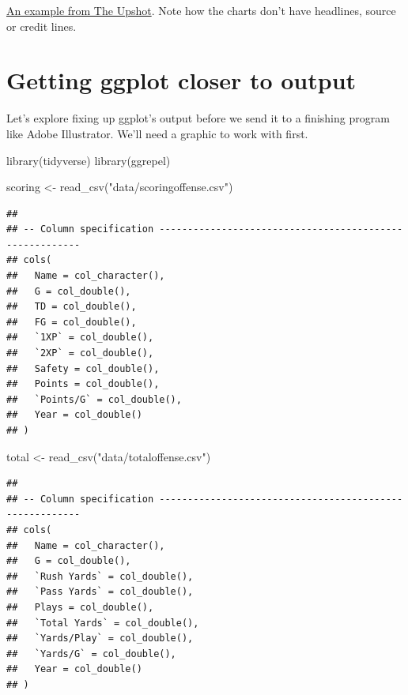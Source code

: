\documentclass[
]{book}
\newenvironment{Shaded}{\begin{snugshade}}{\end{snugshade}}
\newcommand{\FunctionTok}[1]{\textcolor[rgb]{0.00,0.00,0.00}{#1}}
\newcommand{\NormalTok}[1]{#1}
\newcommand{\OtherTok}[1]{\textcolor[rgb]{0.56,0.35,0.01}{#1}}
\newcommand{\StringTok}[1]{\textcolor[rgb]{0.31,0.60,0.02}{#1}}
\begin{document}
\href{https://www.nytimes.com/interactive/2018/02/14/business/economy/inflation-prices.html}{An example from The Upshot}. Note how the charts don't have headlines, source or credit lines.

\hypertarget{getting-ggplot-closer-to-output}{%
\section{Getting ggplot closer to output}\label{getting-ggplot-closer-to-output}}

Let's explore fixing up ggplot's output before we send it to a finishing program like Adobe Illustrator. We'll need a graphic to work with first.

\begin{Shaded}
\begin{Highlighting}[]
\FunctionTok{library}\NormalTok{(tidyverse)}
\FunctionTok{library}\NormalTok{(ggrepel)}
\end{Highlighting}
\end{Shaded}

\begin{Shaded}
\begin{Highlighting}[]
\NormalTok{scoring }\OtherTok{\textless{}{-}} \FunctionTok{read\_csv}\NormalTok{(}\StringTok{"data/scoringoffense.csv"}\NormalTok{)}
\end{Highlighting}
\end{Shaded}

\begin{verbatim}
## 
## -- Column specification --------------------------------------------------------
## cols(
##   Name = col_character(),
##   G = col_double(),
##   TD = col_double(),
##   FG = col_double(),
##   `1XP` = col_double(),
##   `2XP` = col_double(),
##   Safety = col_double(),
##   Points = col_double(),
##   `Points/G` = col_double(),
##   Year = col_double()
## )
\end{verbatim}

\begin{Shaded}
\begin{Highlighting}[]
\NormalTok{total }\OtherTok{\textless{}{-}} \FunctionTok{read\_csv}\NormalTok{(}\StringTok{"data/totaloffense.csv"}\NormalTok{)}
\end{Highlighting}
\end{Shaded}

\begin{verbatim}
## 
## -- Column specification --------------------------------------------------------
## cols(
##   Name = col_character(),
##   G = col_double(),
##   `Rush Yards` = col_double(),
##   `Pass Yards` = col_double(),
##   Plays = col_double(),
##   `Total Yards` = col_double(),
##   `Yards/Play` = col_double(),
##   `Yards/G` = col_double(),
##   Year = col_double()
## )
\end{verbatim}
\end{document}
